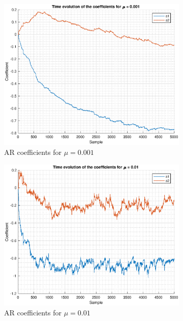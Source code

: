 \documentclass{article}
\begin{document}
\begin{figure}[h!]
\centering
\begin{subfigure}{0.33\textwidth}
\centering
\includegraphics[width = \textwidth]{ar_g001}
\caption{AR coefficients for $\mu=0.001$}
\label{fig:ar_g001}
\end{subfigure}
\begin{subfigure}{0.33\textwidth}
\centering
\includegraphics[width = \textwidth]{ar_g01}
\caption{AR coefficients for $\mu=0.01$}
\label{fig:ar_g01}
\end{subfigure}
\begin{subfigure}{0.33\textwidth}

\end{subfigure}
\end{figure}
\end{document}
